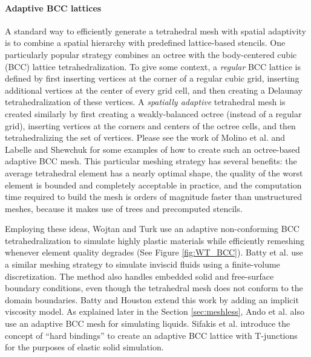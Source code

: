 \paragraph*{Adaptive BCC lattices} A standard way to efficiently generate a tetrahedral mesh with spatial adaptivity is to combine a spatial hierarchy with predefined lattice-based stencils. One particularly popular strategy combines an octree with the body-centered cubic (BCC) lattice tetrahedralization. To give some context, a {\em regular} BCC lattice is defined by first inserting vertices at the corner of a regular cubic grid, inserting additional vertices at the center of every grid cell, and then creating a Delaunay tetrahedralization of these vertices. A {\em spatially adaptive} tetrahedral mesh is created similarly by first creating a weakly-balanced octree (instead of a regular grid), inserting vertices at the corners and centers of the octree cells, and then tetrahedralizing the set of vertices. Please see the work of Molino et al. \cite{Molino2003} and Labelle and Shewchuk \cite{Labelle2007} for some examples of how to create such an octree-based adaptive BCC mesh. This particular meshing strategy has several benefits: the average tetrahedral element has a nearly optimal shape, the quality of the worst element is bounded and completely acceptable in practice, and the computation time required to build the mesh is orders of magnitude faster than unstructured meshes, because it makes use of trees and precomputed stencils.

Employing these ideas, Wojtan and Turk \cite{Wojtan2008} use an adaptive non-conforming BCC tetrahedralization to simulate highly plastic materials while efficiently remeshing whenever element quality degrades (See Figure \ref{fig:WT_BCC}). Batty et al. \cite{Batty2010} use a similar meshing strategy to simulate inviscid fluids using a finite-volume discretization. The method also handles embedded solid and free-surface boundary conditions, even though the tetrahedral mesh does not conform to the domain boundaries. Batty and Houston \cite{Batty2011} extend this work by adding an implicit viscosity model. As explained later in the Section \ref{sec:meshless}, Ando et al. \cite{Ando2013} also use an adaptive BCC mesh for simulating liquids. Sifakis et al. \cite{Sifakis2007:Hybrid} introduce the concept of ``hard bindings'' to create an adaptive BCC lattice with T-junctions for the purposes of elastic solid simulation.


